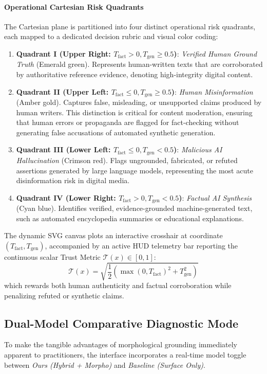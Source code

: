 \paragraph{Operational Cartesian Risk Quadrants}
The Cartesian plane is partitioned into four distinct operational risk quadrants, each mapped to a dedicated decision rubric and visual color coding:
\begin{enumerate}
    \item \textbf{Quadrant I (Upper Right: $T_{\text{fact}} > 0, T_{\text{gen}} \ge 0.5$)}: \textit{Verified Human Ground Truth} (Emerald green). Represents human-written texts that are corroborated by authoritative reference evidence, denoting high-integrity digital content.
    \item \textbf{Quadrant II (Upper Left: $T_{\text{fact}} \le 0, T_{\text{gen}} \ge 0.5$)}: \textit{Human Misinformation} (Amber gold). Captures false, misleading, or unsupported claims produced by human writers. This distinction is critical for content moderation, ensuring that human errors or propaganda are flagged for fact-checking without generating false accusations of automated synthetic generation.
    \item \textbf{Quadrant III (Lower Left: $T_{\text{fact}} \le 0, T_{\text{gen}} < 0.5$)}: \textit{Malicious AI Hallucination} (Crimson red). Flags ungrounded, fabricated, or refuted assertions generated by large language models, representing the most acute disinformation risk in digital media.
    \item \textbf{Quadrant IV (Lower Right: $T_{\text{fact}} > 0, T_{\text{gen}} < 0.5$)}: \textit{Factual AI Synthesis} (Cyan blue). Identifies verified, evidence-grounded machine-generated text, such as automated encyclopedia summaries or educational explanations.
\end{enumerate}

The dynamic SVG canvas plots an interactive crosshair at coordinate $(T_{\text{fact}}, T_{\text{gen}})$, accompanied by an active HUD telemetry bar reporting the continuous scalar Trust Metric $\mathcal{T}(x) \in [0, 1]$:
\begin{equation}
\label{eq:journal_scalar_trust}
\mathcal{T}(x) = \sqrt{\frac{1}{2} \left(\max(0, T_{\text{fact}})^2 + T_{\text{gen}}^2\right)}
\end{equation}
which rewards both human authenticity and factual corroboration while penalizing refuted or synthetic claims.

\subsection{Dual-Model Comparative Diagnostic Mode}
To make the tangible advantages of morphological grounding immediately apparent to practitioners, the interface incorporates a real-time model toggle between \textit{Ours (Hybrid + Morpho)} and \textit{Baseline (Surface Only)}. 

